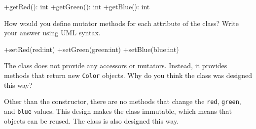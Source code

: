 \begin{answer}[5em]
\begin{javaans}
+getRed(): int
+getGreen(): int
+getBlue(): int
\end{javaans}
\end{answer}


\Q How would you define mutator methods for each attribute of the  class?
Write your answer using UML syntax.

\begin{answer}[5em]
\begin{javaans}
+setRed(red:int)
+setGreen(green:int)
+setBlue(blue:int)
\end{javaans}
\end{answer}


\Q \label{key1}
The  class does not provide any accessors or mutators.
Instead, it provides methods that return new \texttt{Color} objects.
Why do you think the class was designed this way?

\begin{answer} [5em]
Other than the constructor, there are no methods that change the \texttt{red}, \texttt{green}, and \texttt{blue} values.
This design makes the class immutable, which means that objects can be reused.
The  class is also designed this way.
\end{answer}
